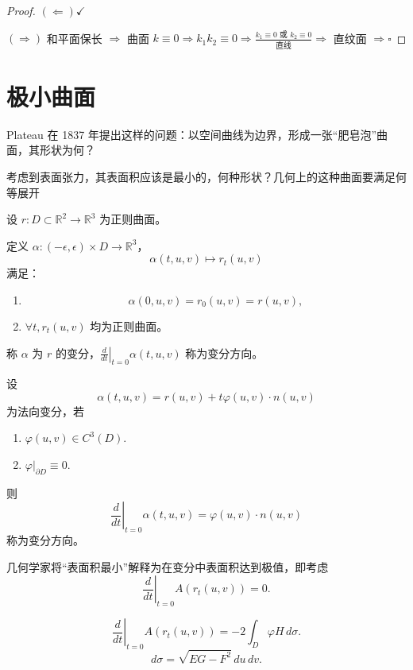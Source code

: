 \documentclass[lang=cn,10pt,thmcnt=section]{elegantbook}
\begin{document}
\begin{proof}
    $(\Leftarrow) \checkmark$

$(\Rightarrow)$ 和平面保长 $\Rightarrow$ 曲面 $k \equiv 0 \Rightarrow k_1 k_2 \equiv 0 \Rightarrow \frac{k_1 \equiv 0 \text{ 或 } k_2 \equiv 0}{直线} \Rightarrow$  直纹面 $\Rightarrow \square$
\end{proof}
\section{极小曲面}
Plateau 在 1837 年提出这样的问题：以空间曲线为边界，形成一张“肥皂泡”曲面，其形状为何？

考虑到表面张力，其表面积应该是最小的，何种形状？几何上的这种曲面要满足何等展开
\begin{definition}[曲面变分]
    设 $r: D \subset \mathbb{R}^2 \rightarrow \mathbb{R}^3$ 为正则曲面。

定义 $\alpha: (-\epsilon, \epsilon) \times D \rightarrow \mathbb{R}^3$，
\[
\alpha(t, u, v) \mapsto r_t(u, v)
\]
满足：
\begin{enumerate}
    \item \[
\alpha(0, u, v) = r_0(u, v) = r(u, v),
\]
    \item  $\forall t, r_t(u, v)$ 均为正则曲面。
\end{enumerate}

称 $\alpha$ 为 $r$ 的变分，$\left. \frac{d}{dt} \right|_{t=0} \alpha(t, u, v)$ 称为变分方向。
\end{definition}
\begin{definition}[法向变分]
    设
\[
\alpha(t, u, v) = r(u, v) + t \varphi(u, v) \cdot n(u, v)
\]
为法向变分，若
\begin{enumerate}
    \item $\varphi(u, v) \in C^3(D)$.
    \item $\varphi \big|_{\partial D} \equiv 0$.
\end{enumerate}

则
\[
\left. \frac{d}{dt} \right|_{t=0} \alpha(t, u, v) = \varphi(u, v) \cdot n(u, v)
\]
称为变分方向。
\end{definition}
几何学家将“表面积最小”解释为在变分中表面积达到极值，即考虑
\[
\left. \frac{d}{dt} \right|_{t=0} A(r_t(u,v)) = 0.
\]


\begin{proposition}
    \[
\left. \frac{d}{dt} \right|_{t=0} A(r_t(u,v)) = -2 \int_D \varphi H \, d\sigma.
\]
\[
d\sigma = \sqrt{EG - F^2} \, du \, dv.
\]
\end{proposition}
\end{document}
